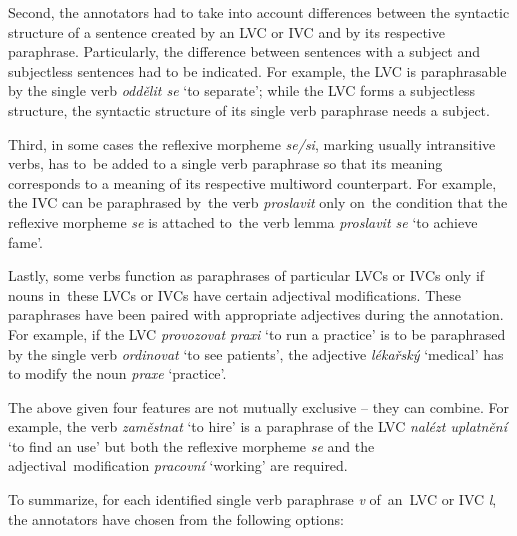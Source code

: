 \documentclass[output=paper
,modfonts
,nonflat]{langsci/langscibook}
\begin{document}
Second, the annotators had to take into account differences between the 
syntactic structure of a sentence created by an LVC or IVC and by its respective 
paraphrase. 
Particularly, the difference between sentences with a subject and subjectless 
sentences had to be indicated. For example, the LVC  is paraphrasable by 
the single verb \textit{oddělit se} `to separate'; while the LVC forms a 
subjectless structure, the syntactic structure of its single verb paraphrase 
needs a subject. 

Third, in some cases the reflexive morpheme \textit{se/si}, marking usually 
intransitive verbs, has to~be added to a single verb paraphrase so that its 
meaning corresponds to a meaning of its respective multiword counterpart.
For example, the IVC  can be paraphrased by~the verb \textit{proslavit} only on~the 
condition that the reflexive morpheme \textit{se} is attached to~the verb lemma 
\textit{proslavit se} `to achieve fame'.

Lastly, some verbs function as paraphrases of particular LVCs or IVCs only if 
nouns in~these LVCs or IVCs have certain adjectival modifications. These 
paraphrases have been paired with appropriate adjectives during the annotation. 
For example, if the LVC \textit{provozovat praxi} `to run a practice' is to be 
paraphrased by the single verb \textit{ordinovat} `to see patients', 
the adjective \textit{lékařský} `medical' has to modify the noun \textit{praxe} 
`practice'. 

The above given four features are not mutually exclusive -- they can combine. 
For example, the verb \textit{zaměstnat} `to hire' is a paraphrase of the LVC 
\textit{nalézt uplatnění} `to find an use' but both the reflexive morpheme 
\textit{se} and the adjectival~modification \textit{pracovní} `working' are 
required.

To summarize, for each identified single verb paraphrase \textit{v} 
of~an~LVC or IVC \textit{l}, the annotators have chosen from the following 
options:
\end{document}
